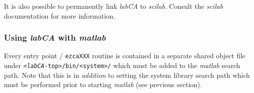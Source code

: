 \documentclass{article}
\newcommand{\sca}{{\em labCA}}
\newcommand{\scilab}{{\em scilab}}
\newcommand{\matlab}{{\em matlab}}
\begin{document}
It is also possible to permanently link \sca{} to \scilab{}. Consult
the \scilab{} documentation for more information.

\subsubsection{Using \sca{} with \matlab}
Every entry point / {\tt ezcaXXX} routine is contained in a separate
shared object file under {\tt <\sca-top>/bin/<system>/} which must
be added to the \matlab{} search path. Note that this is in {\em addition}
to setting the system library search path which must be performed prior
to starting \matlab{} (see previous section).
\end{document}
